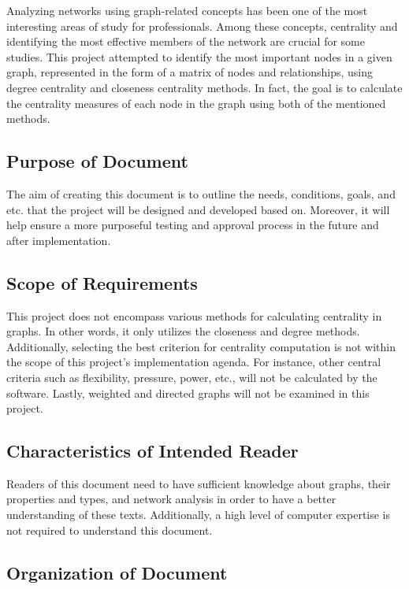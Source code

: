 \documentclass[12pt]{article}
\begin{document}
Analyzing networks using graph-related concepts has been one of the most interesting areas of study for professionals. Among these concepts, centrality and identifying the most effective members of the network are crucial for some studies. This project attempted to identify the most important nodes in a given graph, represented in the form of a matrix of nodes and relationships, using degree centrality and closeness centrality methods. In fact, the goal is to calculate the centrality measures of each node in the graph using both of the mentioned methods.

\subsection{Purpose of Document}
The aim of creating this document is to outline the needs, conditions, goals, and etc. that the project will be designed and developed based on. Moreover, it will help ensure a more purposeful testing and approval process in the future and after implementation.

\subsection{Scope of Requirements} 


This project does not encompass various methods for calculating centrality in graphs. In other words, it only utilizes the closeness  and degree methods. Additionally, selecting the best criterion for centrality computation is not within the scope of this project's implementation agenda. For instance, other central criteria such as flexibility, pressure, power, etc., will not be calculated by the software. Lastly, weighted and directed graphs will not be examined in this project.

\subsection{Characteristics of Intended Reader} \label{sec_IntendedReader}


Readers of this document need to have sufficient knowledge about graphs, their properties and types, and network analysis in order to have a better understanding of these texts. Additionally, a high level of computer expertise is not required to understand this document.

\subsection{Organization of Document}
\end{document}
